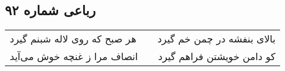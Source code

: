\begin{center}
\section*{رباعی شماره ۹۲}
\label{sec:sh092}
\begin{longtable}{l p{0.5cm} r}
هر صبح که روی لاله شبنم گیرد
&&
بالای بنفشه در چمن خم گیرد
\\
انصاف مرا ز غنچه خوش می‌آید
&&
کو دامن خویشتن فراهم گیرد
\\
\end{longtable}
\end{center}
